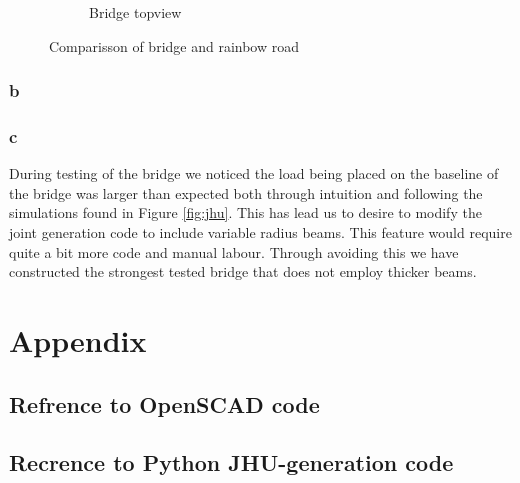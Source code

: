 \documentclass{report}
\begin{document}
\begin{figure}[H]
\begin{subfigure}{.5\textwidth}
		\caption{Bridge topview}
	\end{subfigure}

	\caption{Comparisson of bridge and rainbow road}
	\label{fig:gey}
\end{figure}

\subsection{b}

\subsection{c}

During testing of the bridge we noticed the load being placed on the baseline of the bridge was larger than expected both through intuition and following the simulations found in Figure \ref{fig:jhu}. This has lead us to desire to modify the joint generation code to include variable radius beams. This feature would require quite a bit more code and manual labour. Through avoiding this we have constructed the strongest tested bridge that does not employ thicker beams.

\chapter{Appendix}

\section{Refrence to OpenSCAD code}
\label{sec:openscad}



\section{Recrence to Python JHU-generation code}
\label{sec:jhu-gen}



\listoffigures


\end{document}
